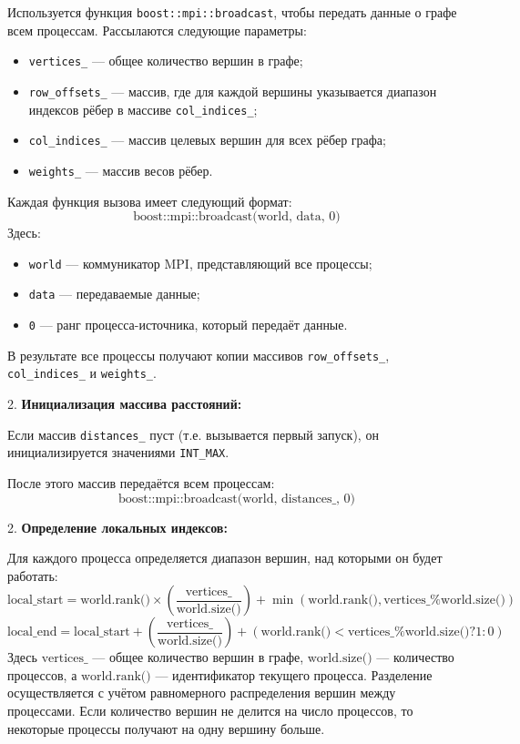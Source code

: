 \documentclass[12pt]{article}
\begin{document}
   Используется функция \texttt{boost::mpi::broadcast}, чтобы передать данные о графе всем процессам. Рассылаются следующие параметры:
   \begin{itemize}
       \item \texttt{vertices\_} — общее количество вершин в графе;
       \item \texttt{row\_offsets\_} — массив, где для каждой вершины указывается диапазон индексов рёбер в массиве \texttt{col\_indices\_};
       \item \texttt{col\_indices\_} — массив целевых вершин для всех рёбер графа;
       \item \texttt{weights\_} — массив весов рёбер.
   \end{itemize}
   Каждая функция вызова имеет следующий формат:
   \[
   \text{boost::mpi::broadcast(world, data, 0)}
   \]
   Здесь:
   \begin{itemize}
       \item \texttt{world} — коммуникатор MPI, представляющий все процессы;
       \item \texttt{data} — передаваемые данные;
       \item \texttt{0} — ранг процесса-источника, который передаёт данные.
   \end{itemize}
   В результате все процессы получают копии массивов \texttt{row\_offsets\_}, \texttt{col\_indices\_} и \texttt{weights\_}.

2. \textbf{Инициализация массива расстояний:}

   Если массив \texttt{distances\_} пуст (т.е. вызывается первый запуск), он инициализируется значениями \texttt{INT\_MAX}.

   После этого массив передаётся всем процессам:
   \[
   \text{boost::mpi::broadcast(world, distances\_, 0)}
   \]
   
2. \textbf{Определение локальных индексов:}

   Для каждого процесса определяется диапазон вершин, над которыми он будет работать:
   \[
   \text{local\_start} = \text{world.rank()} \times \left(\frac{\text{vertices\_}}{\text{world.size()}}\right) + \min(\text{world.rank()}, \text{vertices\_} \% \text{world.size()})
   \]
   \[
   \text{local\_end} = \text{local\_start} + \left(\frac{\text{vertices\_}}{\text{world.size()}}\right) + (\text{world.rank()} < \text{vertices\_} \% \text{world.size()} ? 1 : 0)
   \]
   Здесь \(\text{vertices\_}\) — общее количество вершин в графе, \(\text{world.size()}\) — количество процессов, а \(\text{world.rank()}\) — идентификатор текущего процесса.
   Разделение осуществляется с учётом равномерного распределения вершин между процессами. Если количество вершин не делится на число процессов, то некоторые процессы получают на одну вершину больше.
\end{document}
